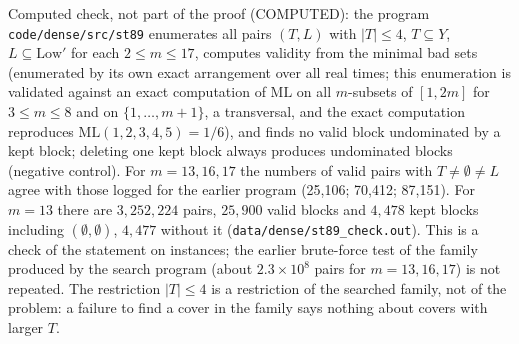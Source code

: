 \documentclass[11pt]{article}
\theoremstyle{remark}
\newcommand{\ML}{\mathrm{ML}}
\begin{document}
\noindent Computed check, not part of the proof (COMPUTED): the program \texttt{code/dense/src/st89} enumerates all pairs $(T,L)$ with $|T|\le4$, $T\subseteq Y$, $L\subseteq\mathrm{Low}'$ for each $2\le m\le17$, computes validity from the minimal bad sets (enumerated by its own exact arrangement over all real times; this enumeration is validated against an exact computation of $\ML$ on all $m$-subsets of $[1,2m]$ for $3\le m\le8$ and on $\{1,\dots,m+1\}$, a transversal, and the exact computation reproduces $\ML(1,2,3,4,5)=1/6$), and finds no valid block undominated by a kept block; deleting one kept block always produces undominated blocks (negative control). For $m=13,16,17$ the numbers of valid pairs with $T\ne\emptyset\ne L$ agree with those logged for the earlier program (25{,}106; 70{,}412; 87{,}151). For $m=13$ there are $3{,}252{,}224$ pairs, $25{,}900$ valid blocks and $4{,}478$ kept blocks including $(\emptyset,\emptyset)$, $4{,}477$ without it (\texttt{data/dense/st89\_check.out}). This is a check of the statement on instances; the earlier brute-force test of the family produced by the search program (about $2.3\times10^8$ pairs for $m=13,16,17$) is not repeated. The restriction $|T|\le4$ is a restriction of the searched family, not of the problem: a failure to find a cover in the family says nothing about covers with larger $T$.
\end{document}
